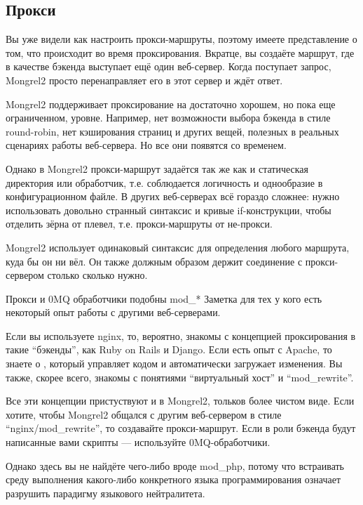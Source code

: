\subsection{Прокси}

Вы уже видели как настроить прокси-маршруты, поэтому имеете представление о том,
что происходит во время проксирования. Вкратце, вы создаёте маршрут, где в
качестве бэкенда выступает ещё один веб-сервер. Когда поступает запрос, Mongrel2
просто перенаправляет его в этот сервер и ждёт ответ.

Mongrel2 поддерживает проксирование на достаточно хорошем, но пока еще
ограниченном, уровне. Например, нет возможности выбора бэкенда в стиле
round-robin, нет кэширования страниц и других вещей, полезных в реальных
сценариях работы веб-сервера. Но все они появятся со временем.

Однако в Mongrel2 прокси-маршрут задаётся так же как и статическая директория
или обработчик, т.е. соблюдается логичность и однообразие в конфигурационном
файле. В других веб-серверах всё гораздо сложнее: нужно использовать довольно
странный синтаксис и кривые if-конструкции, чтобы отделить зёрна от плевел, т.е.
прокси-маршруты от не-прокси.

Mongrel2 использует одинаковый синтаксис для определения любого маршрута, куда
бы он ни вёл. Он также должным образом держит соединение с прокси-сервером
столько сколько нужно.

\begin{aside}{Прокси и 0MQ обработчики подобны mod\_*}
Заметка для тех у кого есть некоторый опыт работы с другими веб-серверами.

Если вы используете nginx, то, вероятно, знакомы с концепцией проксирования в
такие ``бэкенды'', как Ruby on Rails и Django. Если есть опыт с Apache, то знаете
о , который управляет кодом и автоматически загружает изменения.
Вы также, скорее всего, знакомы с понятиями ``виртуальный хост'' и
``mod\_rewrite''.

Все эти концепции пристуствуют и в Mongrel2, тольков более чистом виде. Если
хотите, чтобы Mongrel2 общался с другим веб-сервером в стиле
``nginx/mod\_rewrite'', то создавайте прокси-маршрут. Если в роли бэкенда будут
написанные вами скрипты --- используйте 0MQ-обработчики.

Однако здесь вы не найдёте чего-либо вроде mod\_php, потому что встраивать среду
выполнения какого-либо конкретного языка программирования означает разрушить
парадигму языкового нейтралитета.
\end{aside}

